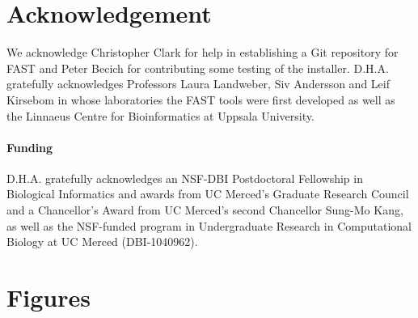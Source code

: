 \documentclass{frontiersSCNS} %
\begin{document}
\section*{Acknowledgement}
We acknowledge Christopher Clark for help in establishing a Git
repository for FAST and Peter Becich for contributing some testing of
the installer. D.H.A. gratefully acknowledges Professors Laura
Landweber, Siv Andersson and Leif Kirsebom in whose laboratories the
FAST tools were first developed as well as the Linnaeus Centre for
Bioinformatics at Uppsala University.

\paragraph{Funding\textcolon} D.H.A. gratefully acknowledges an
NSF-DBI Postdoctoral Fellowship in Biological Informatics and awards
from UC Merced's Graduate Research Council and a Chancellor's Award
from UC Merced's second Chancellor Sung-Mo Kang, as well as the
NSF-funded program in Undergraduate Research in Computational
Biology at UC Merced (DBI-1040962).



\section*{Figures}
\end{document}
